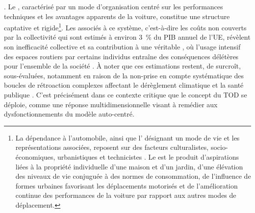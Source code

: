 \begin{refsegment}
{} \textcolor{blue}{\autocites[62]{cervero_transit_1998}[4]{heran_reduction_2001}[2]{heran_zones_2009}}. Le , caractérisé par un mode d’organisation centré sur les performances techniques et les avantages apparents de la voiture, constitue une structure captative et rigide\footnote{
    La dépendance à l’automobile, ainsi que l' désignant un mode de vie et les représentations associées, reposent sur des facteurs culturalistes, socio-économiques, urbanistiques et technicistes \textcolor{blue}{\autocite[12]{heran_reduction_2001}}. Le  est le produit d'aspirations liées à la propriété individuelle d'une maison et d'un jardin, d'une élévation des niveaux de vie conjuguée à des normes de consommation, de l'influence de formes urbaines favorisant les déplacements motorisés et de l'amélioration continue des performances de la voiture par rapport aux autres modes de déplacement.
}. Les  associés à ce système, c'est-à-dire les coûts non couverts par la collectivité qui sont estimés à environ 3~\% du \acrfull{PIB} annuel de l'\acrfull{UE}, révèlent son inefficacité collective \textcolor{blue}{\autocite[34]{becker_couts_2012}} et sa contribution à une véritable  \textcolor{blue}{\autocite{hardin_tragecommuns_1968}}, où l’usage intensif des espaces routiers par certains individus entraîne des conséquences délétères pour l’ensemble de la société \textcolor{blue}{\autocite[23]{6t-bureau_de_recherche_livre_2019}}. À noter que ces estimations restent, de surcroît, sous-évaluées, notamment en raison de la non-prise en compte systématique des boucles de rétroaction complexes affectant le dérèglement climatique et la santé publique \textcolor{blue}{\autocite[66, 72]{gossling_social_2019}}. C’est précisément dans ce contexte critique que le concept du \acrshort{TOD} se déploie, comme une réponse multidimensionnelle visant à remédier aux dysfonctionnements du modèle auto-centré.%


\end{refsegment}

